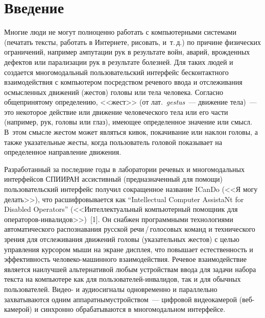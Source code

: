       \begin{multicols}{2}

            \label{st\stat}

\section{Введение}
  
  Многие люди не могут полноценно работать с компьютерными системами 
(печатать тексты, работать в Интернете, рисовать, и~т.\,д.) по причине 
физических ограничений, например ампутации рук в результате войн, аварий, 
врожденных дефектов или парализации рук в результате болезней. Для таких 
людей и создается многомодальный пользовательский интерфейс 
бесконтактного взаимодействия с компьютером посредством речевого ввода и 
отслеживания осмысленных движений (жестов) головы или тела человека. 
Согласно общепринятому определению, <<жест>> (от лат.\ \textit{gestus}~--- движение 
тела)~--- это некоторое действие или движение человеческого тела или его части 
(например, рук, головы или глаз), имеющее определенное значение или смысл. 
В~этом смысле жестом может являться кивок, покачивание или наклон головы, 
а также указательные жесты, когда пользователь головой показывает на 
определенное направление движения. 
  
  Разработанный за последние годы в лаборатории речевых и многомодальных 
интерфейсов \mbox{СПИИРАН} ассистивный (предназначенный для помощи) 
пользовательский интерфейс получил сокращенное название \mbox{ICanDo} (<<Я могу 
делать>>), что рас\-шиф\-ро\-вы\-ва\-ет\-ся как ``Intellectual Computer AssistaNt for 
Disabled Operators'' (<<Интеллектуальный компьютерный помощник для 
операторов-инвалидов>>)~[1]. Он снабжен программными технологиями 
автоматического распознавания русской речи\,/\,го\-ло\-со\-вых команд и 
технического зрения для отслеживания движений головы (указательных 
жес\-тов) с целью управления курсором \mbox{мыши} на экране дисплея, что повышает 
естественность и эффективность че\-ло\-ве\-ко-машинного взаимодействия. Речевое 
взаимодействие является наилучшей альтернативой любым устройствам ввода 
для\linebreak
 задачи набора текста на компьютере как для поль\-зовате\-лей-ин\-ва\-ли\-дов, так 
и для обычных пользователей. Видео- и аудиосигналы одновременно и 
па\-раллельно захватываются одним аппаратным\linebreak устройством~--- цифровой 
видеокамерой (веб-ка\-ме\-рой) и синхронно обрабатываются в многомодальном 
интерфейсе.
  

\end{multicols}

